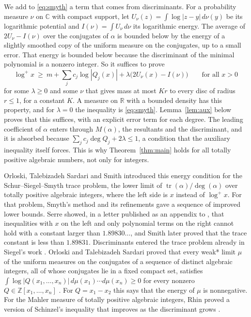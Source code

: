 \documentclass[11pt]{amsart}
\theoremstyle{remark}
\numberwithin{equation}{section}
\newcommand{\R}{\mathbb{R}}
\newcommand{\Z}{\mathbb{Z}}
\newcommand{\C}{\mathbb{C}}
\newcommand{\logp}{\log^{+}}
\newcommand{\tr}{\operatorname{tr}}
\begin{document}
We add to \eqref{eq:smyth} a term that comes from discriminants. For a probability measure $\nu$ on $\C$ with compact support, let $U_\nu(z)=\int\log|z-y|\,d\nu(y)$ be its logarithmic potential and $I(\nu)=\int U_\nu\,d\nu$ its logarithmic energy. The average of $2U_\nu-I(\nu)$ over the conjugates of $\alpha$ is bounded below by the energy of a slightly smoothed copy of the uniform measure on the conjugates, up to a small error. That energy is bounded below because the discriminant of the minimal polynomial is a nonzero integer. So it suffices to prove
\[
\logp x\ \ge\ m+\sum_jc_j\log|Q_j(x)|+\lambda\bigl(2U_\nu(x)-I(\nu)\bigr)\qquad\text{for all }x>0
\]
for some $\lambda\ge0$ and some $\nu$ that gives mass at most $Kr$ to every disc of radius $r\le1$, for a constant $K$. A measure on $\R$ with a bounded density has this property, and for $\lambda=0$ the inequality is \eqref{eq:smyth}. Lemma~\ref{lem:aux} below proves that this suffices, with an explicit error term for each degree. The leading coefficient of $\alpha$ enters through $M(\alpha)$, the resultants and the discriminant, and it is absorbed because $\sum_jc_j\deg Q_j+2\lambda\le1$, a condition that the auxiliary inequality itself forces. This is why Theorem~\ref{thm:main} holds for all totally positive algebraic numbers, not only for integers.

Orloski, Talebizadeh Sardari and Smith \cite{OSS25} introduced this energy condition for the Schur--Siegel--Smyth trace problem, the lower limit of $\tr(\alpha)/\deg(\alpha)$ over totally positive algebraic integers, where the left side is $x$ instead of $\logp x$. For that problem, Smyth's method \cite{Smy84} and its refinements gave a sequence of improved lower bounds. Serre showed, in a letter published as an appendix to \cite{AP08}, that inequalities with $x$ on the left and only polynomial terms on the right cannot hold with a constant larger than $1.89830\ldots$, and Smith \cite{Smi24} later proved that the trace constant is less than $1.89831$. Discriminants entered the trace problem already in Siegel's work \cite{Sie45}. Orloski and Talebizadeh Sardari \cite{OT23} proved that every weak* limit $\mu$ of the uniform measures on the conjugates of a sequence of distinct algebraic integers, all of whose conjugates lie in a fixed compact set, satisfies $\int\log|Q(x_1,\dots,x_n)|\,d\mu(x_1)\cdots d\mu(x_n)\ge0$ for every nonzero $Q\in\Z[x_1,\dots,x_n]$ \cite[Section~1.1]{OSS25}. For $Q=x_1-x_2$ this says that the energy of $\mu$ is nonnegative. For the Mahler measure of totally positive algebraic integers, Rhin \cite{Rhi04} proved a version of Schinzel's inequality that improves as the discriminant grows \cite[Section~9.2]{Smy08}.
\end{document}
